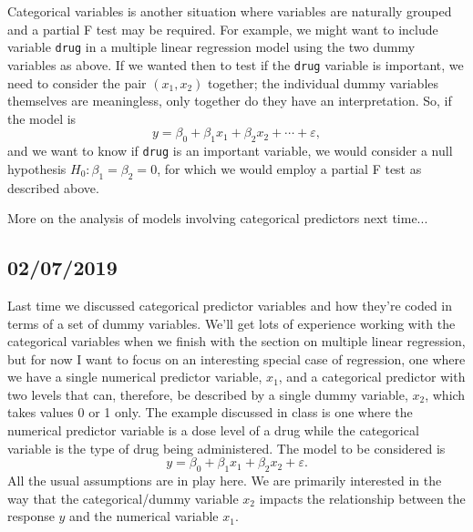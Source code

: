 \documentclass[a4paper, 12pt]{article}
\theoremstyle{plain}
\theoremstyle{definition}
\theoremstyle{remark}
\newcommand{\eps}{\varepsilon}
\begin{document}
Categorical variables is another situation where variables are naturally grouped and a partial F test may be required.  For example, we might want to include variable {\tt drug} in a multiple linear regression model using the two dummy variables as above.  If we wanted then to test if the {\tt drug} variable is important, we need to consider the pair $(x_1,x_2)$ together; the individual dummy variables themselves are meaningless, only together do they have an interpretation.  So, if the model is 
\[ y = \beta_0 + \beta_1 x_1 + \beta_2 x_2 + \cdots + \eps, \]
and we want to know if {\tt drug} is an important variable, we would consider a null hypothesis $H_0: \beta_1 = \beta_2 = 0$, for which we would employ a partial F test as described above.  

More on the analysis of models involving categorical predictors next time...



\subsection*{02/07/2019}

Last time we discussed categorical predictor variables and how they're coded in terms of a set of dummy variables.  We'll get lots of experience working with the categorical variables when we finish with the section on multiple linear regression, but for now I want to focus on an interesting special case of regression, one where we have a single numerical predictor variable, $x_1$, and a categorical predictor with two levels that can, therefore, be described by a single dummy variable, $x_2$, which takes values 0 or 1 only.  The example discussed in class is one where the numerical predictor variable is a dose level of a drug while the categorical variable is the type of drug being administered.  The model to be considered is 
\[ y = \beta_0 + \beta_1 x_1 + \beta_2 x_2 + \eps. \]
All the usual assumptions are in play here.  We are primarily interested in the way that the categorical/dummy variable $x_2$ impacts the relationship between the response $y$ and the numerical variable $x_1$.  
\end{document}
